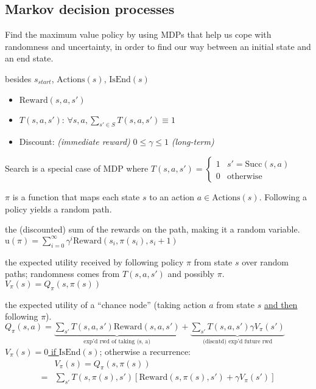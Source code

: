 \subsection{Markov decision processes}

Find the maximum value policy by using MDPs that help us cope with randomness
and uncertainty, in order to find our way between an initial state and an end
state.

 besides $s_{start}$, $\text{Actions}(s)$, $\text{IsEnd}(s)$
\begin{itemize}
    \item $\text{Reward}(s,a,s')$
    \item $T(s,a,s')$: $\forall s,a, \sum_{s'\in S} T(s,a,s') \equiv 1$
    \item Discount: \emph{(immediate reward)} $0 \le \gamma \le 1$ \emph{(long-term)}
\end{itemize}
Search is a special case of MDP where $T(s,a,s') = \begin{cases}
    1 & s' = \text{Succ}(s,a) \\
    0 & \text{otherwise}
\end{cases}$

 $\pi$ is a function that maps each state $s$ to an action $a \in
\text{Actions}(s)$. Following a policy yields a random path.

 the (discounted) sum of the rewards on the
path, making it a random variable.
$\text{u}(\pi) = \sum_{i=0}^{\infty} \gamma^i \text{Reward}(s_i, \pi(s_i), s_i + 1)$

 the expected utility received by
following policy $\pi$ from state $s$ over random paths; randomness comes from
$T(s,a,s')$ and possibly $\pi$. $V_\pi(s) = Q_\pi(s,\pi(s))$

 the expected utility of a ``chance node'' (taking action $a$ from
state $s$ \underline{and then} following $\pi$).
$Q_\pi(s,a)
= \underbrace{\sum_{s'}T(s,a,s') \text{Reward}(s,a,s')}_{\text{exp'd rwd of taking (s, a)}}
+ \underbrace{\sum_{s'}T(s,a,s') \gamma V_\pi(s')}_{\text{(discntd) exp'd future rwd}}$
\underline{$V_\pi(s) = 0$ if $\text{IsEnd}(s)$};
otherwise a recurrence:
\begin{displaymath}
\boxed{
\begin{aligned}
    &V_\pi(s) = Q_\pi(s,\pi(s)) \\
    =&\sum_{s'}T(s,\pi(s),s')\left[\text{Reward}(s,\pi(s),s') + \gamma V_\pi(s')\right]
\end{aligned}
}
\end{displaymath}

